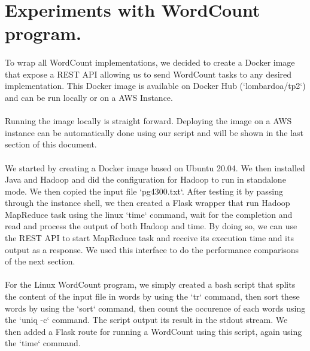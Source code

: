 \section{Experiments with WordCount program.} \label{T1}

\paragraph{}To wrap all WordCount implementations, we decided to create a Docker image that expose a REST API allowing us to send WordCount tasks to any desired implementation. This Docker image is available on Docker Hub (`lombardoa/tp2`) and can be run locally or on a AWS Instance. 

\paragraph{}Running the image locally is straight forward. Deploying the image on a AWS instance can be automatically done using our script and will be shown in the last section of this document.

\paragraph{}We started by creating a Docker image based on Ubuntu 20.04. We then installed Java and Hadoop and did the configuration for Hadoop to run in standalone mode. We then copied the input file `pg4300.txt`. After testing it by passing through the instance shell, we then created a Flask wrapper that run Hadoop MapReduce task using the linux `time` command, wait for the completion and read and process the output of both Hadoop and time. By doing so, we can use the REST API to start MapReduce task and receive its execution time and its output as a response. We used this interface to do the performance comparisons of the next section.

\paragraph{}For the Linux WordCount program, we simply created a bash script that splits the content of the input file in words by using the `tr` command, then sort these words by using the `sort` command, then count the occurence of each words using the `uniq -c` command. The script output its result in the stdout stream. We then added a Flask route for running a WordCount using this script, again using the `time` command.

